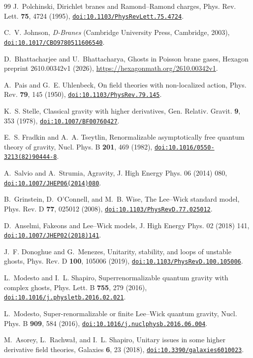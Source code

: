 \documentclass[a4paper,11pt]{article}
\newcommand{\doilink}[1]{\href{https://doi.org/#1}{\nolinkurl{doi:#1}}}
\begin{document}
\begin{thebibliography}{99}
J.~Polchinski, Dirichlet branes and Ramond--Ramond charges, Phys. Rev. Lett. \textbf{75}, 4724 (1995), \doilink{10.1103/PhysRevLett.75.4724}.

C.~V. Johnson, \emph{D-Branes} (Cambridge University Press, Cambridge, 2003), \doilink{10.1017/CBO9780511606540}.

D.~Bhattacharjee and U.~Bhattacharya, Ghosts in Poisson brane gases, Hexagon preprint 2610.00342v1 (2026), \url{https://hexagonmath.org/2610.00342v1}.

A.~Pais and G.~E. Uhlenbeck, On field theories with non-localized action, Phys. Rev. \textbf{79}, 145 (1950), \doilink{10.1103/PhysRev.79.145}.

K.~S. Stelle, Classical gravity with higher derivatives, Gen. Relativ. Gravit. \textbf{9}, 353 (1978), \doilink{10.1007/BF00760427}.

E.~S. Fradkin and A.~A. Tseytlin, Renormalizable asymptotically free quantum theory of gravity, Nucl. Phys. B \textbf{201}, 469 (1982), \doilink{10.1016/0550-3213(82)90444-8}.

A.~Salvio and A.~Strumia, Agravity, J. High Energy Phys. 06 (2014) 080, \doilink{10.1007/JHEP06(2014)080}.

B.~Grinstein, D.~O'Connell, and M.~B. Wise, The Lee--Wick standard model, Phys. Rev. D \textbf{77}, 025012 (2008), \doilink{10.1103/PhysRevD.77.025012}.

D.~Anselmi, Fakeons and Lee--Wick models, J. High Energy Phys. 02 (2018) 141, \doilink{10.1007/JHEP02(2018)141}.

J.~F. Donoghue and G.~Menezes, Unitarity, stability, and loops of unstable ghosts, Phys. Rev. D \textbf{100}, 105006 (2019), \doilink{10.1103/PhysRevD.100.105006}.

L.~Modesto and I.~L. Shapiro, Superrenormalizable quantum gravity with complex ghosts, Phys. Lett. B \textbf{755}, 279 (2016), \doilink{10.1016/j.physletb.2016.02.021}.

L.~Modesto, Super-renormalizable or finite Lee--Wick quantum gravity, Nucl. Phys. B \textbf{909}, 584 (2016), \doilink{10.1016/j.nuclphysb.2016.06.004}.

M.~Asorey, L.~Rachwa{\l}, and I.~L. Shapiro, Unitary issues in some higher derivative field theories, Galaxies \textbf{6}, 23 (2018), \doilink{10.3390/galaxies6010023}.


\end{thebibliography}
\end{document}
